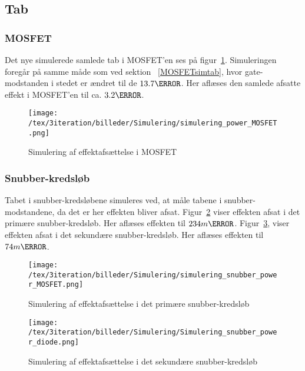 \subsection{Tab}

\subsubsection{MOSFET}
Det nye simulerede samlede tab i MOSFET'en ses på figur~\ref{fig:simulering_power_MOSFET}. Simuleringen foregår på samme måde som ved sektion ~\ref{MOSFETsimtab}, hvor gate-modstanden i stedet er ændret til de $13.7\ohm$. Her aflæses den samlede afsatte effekt i MOSFET'en til ca. $3.2\watt$. 

\begin{figure}[H]
	\center
	\texttt{[image: /tex/3iteration/billeder/Simulering/simulering\_power\_MOSFET.png]}
	\caption{Simulering af effektafsættelse i MOSFET}
	\label{fig:simulering_power_MOSFET}
\end{figure}

\subsubsection{Snubber-kredsløb}
Tabet i snubber-kredsløbene simuleres ved, at måle tabene i snubber-modstandene, da det er her effekten bliver afsat. Figur~\ref{fig:simulering_power_snubber_MOSFET} viser effekten afsat i det primære snubber-kredsløb. Her aflæses effekten til $234m\watt$. Figur~\ref{fig:simulering_power_snubber_diode}, viser effekten afsat i det sekundære snubber-kredsløb. Her aflæses effekten til $74m\watt$. 

\begin{figure}[H]
	\center
	\texttt{[image: /tex/3iteration/billeder/Simulering/simulering\_snubber\_power\_MOSFET.png]}
	\caption{Simulering af effektafsættelse i det primære snubber-kredsløb}
	\label{fig:simulering_power_snubber_MOSFET}
\end{figure}

\begin{figure}[H]
	\center
	\texttt{[image: /tex/3iteration/billeder/Simulering/Simulering\_snubber\_power\_diode.png]}
	\caption{Simulering af effektafsættelse i det sekundære snubber-kredsløb}
	\label{fig:simulering_power_snubber_diode}
\end{figure}

